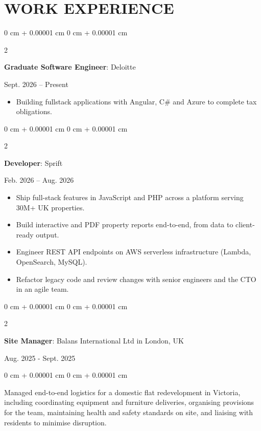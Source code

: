 \documentclass[10pt, letterpaper]{article}
\newenvironment{highlights}{
    \begin{itemize}[
        topsep=0.10 cm,
        parsep=0.10 cm,
        partopsep=0pt,
        itemsep=0pt,
        leftmargin=0 cm + 10pt
    ]
}{
    \end{itemize}
} %
\newenvironment{onecolentry}{
    \begin{adjustwidth}{
        0 cm + 0.00001 cm
    }{
        0 cm + 0.00001 cm
    }
}{
    \end{adjustwidth}
} %
\newenvironment{twocolentry}[2][]{
    \onecolentry
    \def\secondColumn{#2}
    \setcolumnwidth{\fill, 4.5 cm}
    \begin{paracol}{2}
}{
    \switchcolumn \raggedleft \secondColumn
    \end{paracol}
    \endonecolentry
} %
\begin{document}
    \section{WORK EXPERIENCE}
        
        \vspace{0.18cm}
        \begin{twocolentry}{
            Sept. 2026 – Present
        }
            \textbf{Graduate Software Engineer}: Deloitte
        \end{twocolentry}
        \begin{highlights}
            \item Building fullstack applications with Angular, C\# and Azure to complete tax obligations.
        \end{highlights}

        \vspace{0.18cm}
        \begin{twocolentry}{
            Feb. 2026 – Aug. 2026
        }
            \textbf{Developer}: Sprift
        \end{twocolentry}
        \begin{highlights}
            \item Ship full-stack features in JavaScript and PHP across a platform serving 30M+ UK properties.
            \item Build interactive and PDF property reports end-to-end, from data to client-ready output.
            \item Engineer REST API endpoints on AWS serverless infrastructure (Lambda, OpenSearch, MySQL).
            \item Refactor legacy code and review changes with senior engineers and the CTO in an agile team.
        \end{highlights}

        \vspace{0.2cm}
        \begin{twocolentry} {
            Aug. 2025 - Sept. 2025
        }
            \textbf{Site Manager}: Balans International Ltd in London, UK
        \end{twocolentry}
        \begin{onecolentry}
            Managed end-to-end logistics for a domestic flat redevelopment in Victoria, including coordinating equipment and furniture deliveries, organising provisions for the team, maintaining health and safety standards on site, and liaising with residents to minimise disruption.
        \end{onecolentry}
        
\end{document}
